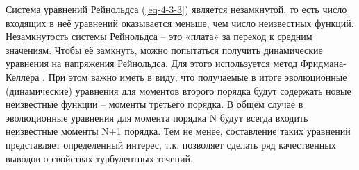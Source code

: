 Система уравнений Рейнольдса (\ref{eq-4-3-3}) является незамкнутой, то есть число входящих в неё уравнений оказывается меньше, чем число неизвестных функций.
Незамкнутость системы Рейнольдса – это «плата» за переход к средним значениям.
Чтобы её замкнуть, можно попытаться получить динамические уравнения на напряжения Рейнольдса.
Для этого используется метод Фридмана-Келлера \cite{Носов-2013}.
При этом важно иметь в виду, что получаемые в итоге эволюционные (динамические) уравнения для моментов второго порядка будут содержать новые неизвестные функции – моменты третьего порядка.
В общем случае в эволюционные уравнения для момента порядка N будут всегда входить неизвестные моменты N+1 порядка.
Тем не менее, составление таких уравнений представляет определенный интерес, т.к. позволяет сделать ряд качественных выводов о свойствах турбулентных течений.
